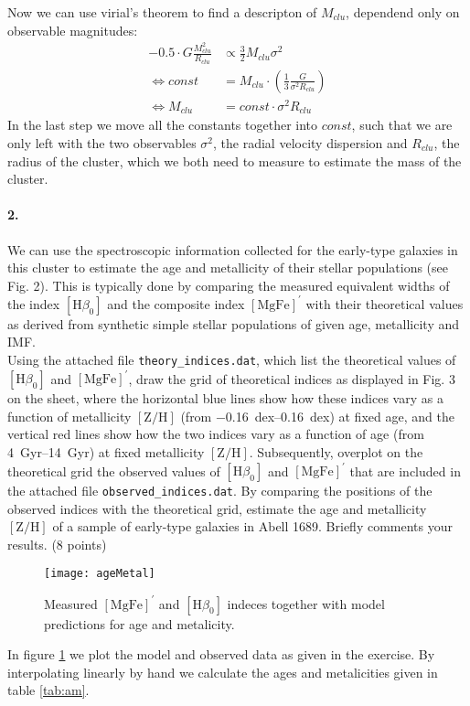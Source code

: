 \documentclass[11pt,a4paper,twoside]{article}
\newcommand{\MgFe}{\ensuremath{[\text{MgFe}]^\prime} }
\newcommand{\ZH}{\ensuremath{[\text{Z}/\text{H}]} }
\newcommand{\Hbo}{\ensuremath{[\text{H}\beta_0]} }
\begin{document}
Now we can use virial's theorem to find a descripton of $M_{clu}$, dependend
only on observable magnitudes:
\begin{align}
    -0.5\cdot G \frac{M_{clu}^2}{R_{clu}} &\propto \frac{3}{2} M_{clu} \sigma^2\\
    \Leftrightarrow const &= M_{clu} \cdot\left( \frac{1}{3}\frac{G}{\sigma^2 R_{clu}}\right) \\
    \Leftrightarrow M_{clu} &= const \cdot \sigma^2 R_{clu}
\end{align}
In the last step we move all the constants together into $const$, such that we
are only left with the two observables $\sigma^2$, the radial velocity dispersion
and $R_{clu}$, the radius of the cluster, which we both need
to measure to estimate the mass of the cluster.

\paragraph{2.} We can use the spectroscopic information collected for the 
early-type galaxies in this cluster to estimate the age and metallicity of 
their stellar populations (see Fig. 2). This is typically done by comparing 
the measured equivalent widths of the index $\Hbo$ and the composite index 
$\MgFe$ with their theoretical values as derived from synthetic simple
stellar populations of given age, metallicity and IMF.\\

Using the attached file \verb+theory_indices.dat+, which list the theoretical 
values of $\Hbo$ and $\MgFe$, draw the grid of theoretical indices as 
displayed in Fig. 3 on the sheet, where the horizontal blue lines show how 
these indices vary as a function of metallicity $\ZH$ (from 
\SIrange{-0.16}{0.16}{dex}) at fixed age, and the vertical red lines show how 
the two indices vary as a function of age (from \SIrange{4}{14}{Gyr}) 
at fixed metallicity $\ZH$. Subsequently, overplot on the theoretical grid 
the observed values of $\Hbo$ and $\MgFe$ that are included in the attached 
file \verb+observed_indices.dat+. By comparing the positions of the observed 
indices with the theoretical grid, estimate the age and metallicity $\ZH$ of 
a sample of early-type galaxies in Abell 1689. Briefly comments your results. 
(8 points) \\

\begin{figure}[h!]
\centering
\texttt{[image: ageMetal]}
\caption{Measured \MgFe and \Hbo indeces together with model predictions
for age and metalicity.}
\label{fig:am}
\end{figure}
In figure \ref{fig:am} we plot the model and observed data as given in the 
exercise. By interpolating linearly by hand we calculate the ages and
metalicities given in table \ref{tab:am}.
\end{document}
